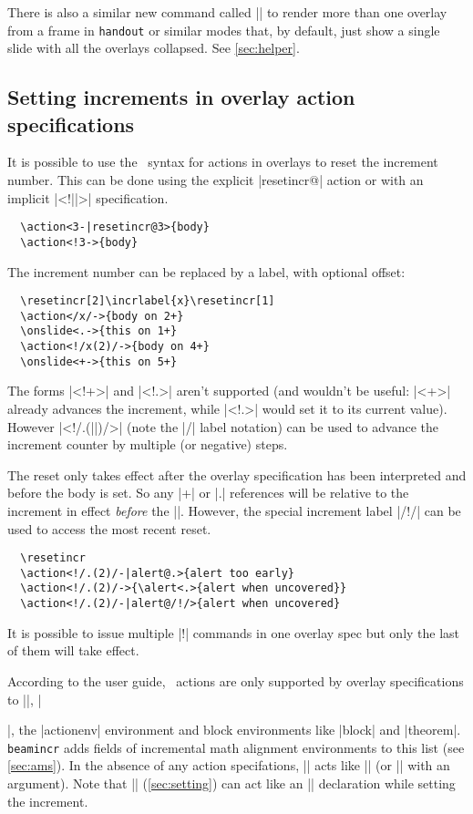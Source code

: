 \documentclass[a4paper]{ltxdoc}
\begin{document}
There is also a similar new command called |\handoutframe| to render more than
one overlay from a frame in \texttt{handout} or similar modes that, by default,
just show a single slide with all the overlays collapsed.  See \cref{sec:helper}.

\subsection{Setting increments in overlay action specifications}

It is possible to use the \beamer\ syntax for actions in overlays to reset the
increment number.  This can be done using the explicit |resetincr@| action or
with an implicit |<!||>| specification.  \example
\begin{verbatim}
  \action<3-|resetincr@3>{body}
  \action<!3->{body}
\end{verbatim}
The increment number can be replaced by a label, with optional offset:
\begin{verbatim}
  \resetincr[2]\incrlabel{x}\resetincr[1]
  \action</x/->{body on 2+}
  \onslide<.->{this on 1+}
  \action<!/x(2)/->{body on 4+}
  \onslide<+->{this on 5+}
\end{verbatim}
The forms |<!+>| and |<!.>| aren't supported (and wouldn't be useful: |<+>|
already advances the increment, while |<!.>| would set it to its current value).
However |<!/.(||)/>| (note the |/| label notation) can be used to advance the
increment counter by multiple (or negative) steps.

The reset only takes effect after the overlay specification has been interpreted
and before the body is set.  So any |+| or |.| references will be relative to
the increment in effect \emph{before} the |\action|.  However, the special
increment label |/!/| can be used to access the most recent reset.
\example
\begin{verbatim}
  \resetincr
  \action<!/.(2)/-|alert@.>{alert too early}
  \action<!/.(2)/->{\alert<.>{alert when uncovered}}
  \action<!/.(2)/-|alert@/!/>{alert when uncovered}
\end{verbatim}
It is possible to issue multiple |!| commands in one overlay spec but only the
last of them will take effect.

According to the user guide, \beamer\ actions are only supported by overlay
specifications to |\action|, |\item|, the |actionenv| environment and block
environments like |block| and |theorem|.  \texttt{beamincr} adds fields of
incremental math alignment environments to this list (see \cref{sec:ams}).  In
the absence of any action specifations, |\action| acts like |\uncover| (or
|\onslide| with an argument).  Note that |\fromslide| (\cref{sec:setting}) can
act like an |\onslide| declaration while setting the increment.
\end{document}
